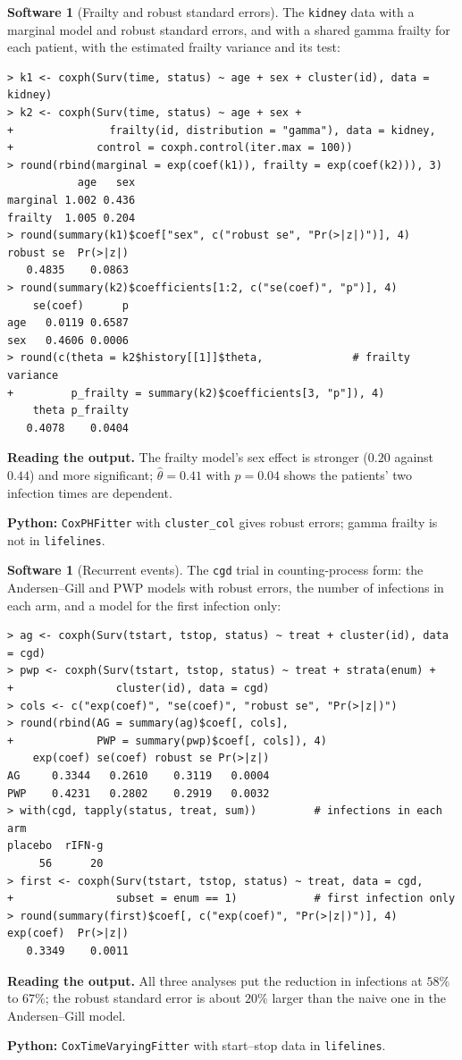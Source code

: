 \documentclass[11pt,a4paper]{article}
\numberwithin{equation}{section}
\theoremstyle{definition}
\newtheorem{software}[thm]{Software}
\begin{document}
\begin{software}[Frailty and robust standard errors]
\label{sw:frailty}
The \texttt{kidney} data with a marginal model and robust standard errors, and with a shared gamma frailty for each patient, with the estimated frailty variance and its test:
{\small\begin{verbatim}
> k1 <- coxph(Surv(time, status) ~ age + sex + cluster(id), data = kidney)
> k2 <- coxph(Surv(time, status) ~ age + sex +
+               frailty(id, distribution = "gamma"), data = kidney,
+             control = coxph.control(iter.max = 100))
> round(rbind(marginal = exp(coef(k1)), frailty = exp(coef(k2))), 3)
           age   sex
marginal 1.002 0.436
frailty  1.005 0.204
> round(summary(k1)$coef["sex", c("robust se", "Pr(>|z|)")], 4)
robust se  Pr(>|z|) 
   0.4835    0.0863 
> round(summary(k2)$coefficients[1:2, c("se(coef)", "p")], 4)
    se(coef)      p
age   0.0119 0.6587
sex   0.4606 0.0006
> round(c(theta = k2$history[[1]]$theta,              # frailty variance
+         p_frailty = summary(k2)$coefficients[3, "p"]), 4)
    theta p_frailty 
   0.4078    0.0404 
\end{verbatim}}
\textbf{Reading the output.} The frailty model's sex effect is stronger ($0.20$ against $0.44$) and more significant; $\hat\theta = 0.41$ with $p = 0.04$ shows the patients' two infection times are dependent.

\textbf{Python:} \texttt{CoxPHFitter} with \texttt{cluster\_col} gives robust errors; gamma frailty is not in \texttt{lifelines}.
\end{software}

\begin{software}[Recurrent events]
\label{sw:recurrent}
The \texttt{cgd} trial in counting-process form: the Andersen--Gill and PWP models with robust errors, the number of infections in each arm, and a model for the first infection only:
{\small\begin{verbatim}
> ag <- coxph(Surv(tstart, tstop, status) ~ treat + cluster(id), data = cgd)
> pwp <- coxph(Surv(tstart, tstop, status) ~ treat + strata(enum) +
+                cluster(id), data = cgd)
> cols <- c("exp(coef)", "se(coef)", "robust se", "Pr(>|z|)")
> round(rbind(AG = summary(ag)$coef[, cols],
+             PWP = summary(pwp)$coef[, cols]), 4)
    exp(coef) se(coef) robust se Pr(>|z|)
AG     0.3344   0.2610    0.3119   0.0004
PWP    0.4231   0.2802    0.2919   0.0032
> with(cgd, tapply(status, treat, sum))         # infections in each arm
placebo  rIFN-g 
     56      20 
> first <- coxph(Surv(tstart, tstop, status) ~ treat, data = cgd,
+                subset = enum == 1)            # first infection only
> round(summary(first)$coef[, c("exp(coef)", "Pr(>|z|)")], 4)
exp(coef)  Pr(>|z|) 
   0.3349    0.0011 
\end{verbatim}}
\textbf{Reading the output.} All three analyses put the reduction in infections at $58\%$ to $67\%$; the robust standard error is about $20\%$ larger than the naive one in the Andersen--Gill model.

\textbf{Python:} \texttt{CoxTimeVaryingFitter} with start--stop data in \texttt{lifelines}.
\end{software}
\end{document}
